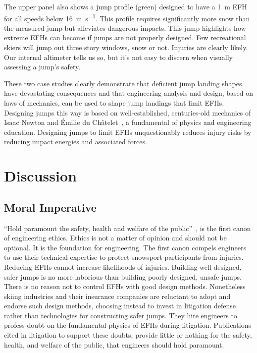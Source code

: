 \documentclass[smallextended]{svjour3}       %
\begin{document}
The upper panel also shows a jump profile (green) designed to have a
1~\si{\meter} EFH for all speeds below
16~\si{\meter\per\second}. This profile requires significantly more snow than
the measured jump but alleviates dangerous impacts. This jump highlights how extreme EFHs can become if jumps are not properly
designed.  Few recreational skiers will jump out three story windows, snow or
not. Injuries are clearly likely. Our internal altimeter tells us so, but it's
not easy to discern when visually assessing a jump's safety.  


These two case studies clearly demonstrate that deficient jump landing shapes
have devastating consequences and that engineering analysis and design, based
on laws of mechanics, can be used to shape jump landings that limit EFHs.
Designing jumps this way is based on well-established, centuries-old mechanics
of Isaac Newton and Émilie du Châtelet~\cite{Zinsser2007}, a fundamental of physics and engineering education. Designing jumps to limit EFHs unquestionably reduces injury risks by reducing impact energies and associated forces.

\section{Discussion}
\subsection{Moral Imperative}
\label{sec:moral}
%
``Hold paramount the safety, health and welfare of the
public''~\cite{NSPE2019}, is the first canon of engineering ethics. Ethics is
not a matter of opinion and should not be optional. It is the foundation for
engineering. The first canon compels engineers to use their technical expertise
to protect snowsport participants from injuries. Reducing EFHs cannot increase likelihoods of injuries. Building well designed, safer
jumps is no more laborious than building poorly designed, unsafe jumps. There is no reason not to control EFHs with good design methods. Nonetheless skiing
industries and their insurance companies are reluctant to adopt and endorse
such design methods, choosing instead to invest in litigation
defense rather than technologies for constructing safer jumps. They hire
engineers to profess doubt on the fundamental physics of EFHs during litigation. Publications cited in litigation to support these doubts, provide little or nothing for the safety, health, and welfare of the public, that engineers should hold paramount.
\end{document}
